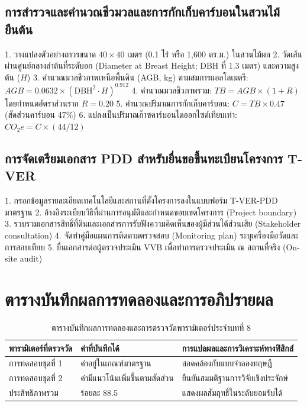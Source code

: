 \subsection{การสำรวจและคำนวณชีวมวลและการกักเก็บคาร์บอนในสวนไม้ยืนต้น}
\begin{conceptbox}
1. วางแปลงตัวอย่างถาวรขนาด $40 \times 40$ เมตร (0.1 ไร่ หรือ 1,600 ตร.ม.) ในสวนไม้ผล
2. วัดเส้นผ่านศูนย์กลางลำต้นที่ระดับอก (Diameter at Breast Height; DBH ที่ 1.3 เมตร) และความสูงต้น ($H$)
3. คำนวณมวลชีวภาพเหนือพื้นดิน (AGB, kg) ตามสมการแอลโลเมตรี: $AGB = 0.0632 \times (\text{DBH}^2 \cdot H)^{0.912}$
4. คำนวณมวลชีวภาพรวม: $TB = AGB \times (1 + R)$ โดยกำหนดอัตราส่วนราก $R = 0.20$
5. คำนวณปริมาณการกักเก็บคาร์บอน: $C = TB \times 0.47$ (สัดส่วนคาร์บอน 47\%)
6. แปลงเป็นปริมาณก๊าซคาร์บอนไดออกไซด์เทียบเท่า: $CO_2e = C \times (44/12)$
\end{conceptbox}

\subsection{การจัดเตรียมเอกสาร PDD สำหรับยื่นขอขึ้นทะเบียนโครงการ T-VER}
\begin{conceptbox}
1. กรอกข้อมูลรายละเอียดเทคโนโลยีและสถานที่ตั้งโครงการลงในแบบฟอร์ม T-VER-PDD มาตรฐาน
2. อ้างอิงระเบียบวิธีที่ผ่านการอนุมัติและกำหนดขอบเขตโครงการ (Project boundary)
3. รวบรวมเอกสารสิทธิ์ที่ดินและเอกสารการรับฟังความคิดเห็นของผู้มีส่วนได้ส่วนเสีย (Stakeholder consultation)
4. จัดทำคู่มือแผนการติดตามตรวจสอบ (Monitoring plan) ระบุเครื่องมือวัดและการสอบเทียบ
5. ยื่นเอกสารต่อผู้ตรวจประเมิน VVB เพื่อทำการตรวจประเมิน ณ สถานที่จริง (On-site audit)
\end{conceptbox}

\section{ตารางบันทึกผลการทดลองและการอภิปรายผล}
\begin{table}[H]
\centering\small
\caption{ตารางบันทึกผลการทดลองและการตรวจวัดพารามิเตอร์ประจำบทที่ 8}
\label{tab:ch08_datasheet}
\begin{tabularx}{\textwidth}{p{} p{} X}
\toprule
\textbf{พารามิเตอร์ที่ตรวจวัด} & \textbf{ค่าที่บันทึกได้} & \textbf{การแปลผลและการวิเคราะห์ทางฟิสิกส์} \\
\midrule
การทดสอบชุดที่ 1 & ค่าอยู่ในเกณฑ์มาตรฐาน & สอดคล้องกับแบบจำลองทฤษฎี \\
การทดสอบชุดที่ 2 & ค่ามีแนวโน้มเพิ่มขึ้นตามสัดส่วน & ยืนยันสมมติฐานการวิจัยเชิงประจักษ์ \\
ประสิทธิภาพรวม & ร้อยละ 88.5 & แสดงผลสัมฤทธิ์ในระดับยอมรับได้ \\
\bottomrule
\end{tabularx}
\end{table}

